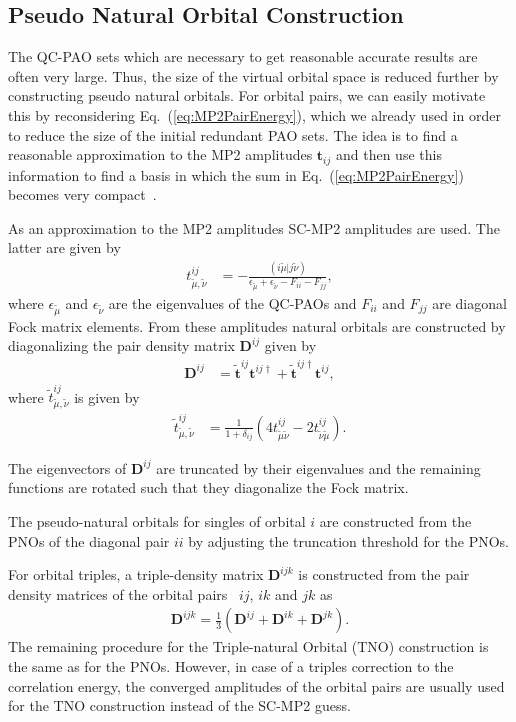 \subsection{Pseudo Natural Orbital Construction}

The QC-PAO sets which are necessary to get reasonable accurate results are often very large. Thus, the size of the
virtual orbital space is reduced further by constructing pseudo natural orbitals. For orbital pairs, we can easily
motivate this by reconsidering Eq.~(\ref{eq:MP2PairEnergy}), which we already used in order to reduce the size of
the initial redundant PAO sets. The idea is to find a reasonable approximation to the MP2 amplitudes $\pmb{t}_{ij}$
and then use this information to find a basis in which the sum in Eq.~(\ref{eq:MP2PairEnergy}) becomes very
compact~\cite{Neese2009b}.

As an approximation to the MP2 amplitudes SC-MP2 amplitudes are used. The latter are given by
\begin{align}
  t^{ij}_{\tilde{\mu},\tilde{\nu}} &= -\frac{(i\tilde{\mu}|j\tilde{\nu})}{{\epsilon_{\tilde{\mu}}}+{\epsilon_{\tilde{\nu}}}-F_{ii}-F_{jj}},
\end{align}
where $\epsilon_{\tilde{\mu}}$ and $\epsilon_{\tilde{\nu}}$ are the eigenvalues of the QC-PAOs and $F_{ii}$ and $F_{jj}$
are diagonal Fock matrix elements.
From these amplitudes natural orbitals are constructed by diagonalizing the pair density matrix $\pmb{D}^{ij}$ given
by
\begin{align}
  \mathbf{D}^{ij} &= \tilde{\mathbf{t}}^{ij}\mathbf{t}^{ij\dagger} + \tilde{\mathbf{t}}^{ij\dagger}\mathbf{t}^{ij},
\end{align}
where $\tilde{t}^{ij}_{\tilde{\mu},\tilde{\nu}}$ is given by
\begin{align}
  \tilde{t}^{ij}_{\tilde{\mu},\tilde{\nu}}  &= \frac{1}{1+\delta_{ij}}(4t^{ij}_{\tilde{\mu}\tilde{\nu}}-2t^{ij}_{\tilde{\nu}\tilde{\mu}}).
\end{align}

The eigenvectors of $\mathbf{D}^{ij}$ are truncated by their eigenvalues and the remaining functions are
rotated such that they diagonalize the Fock matrix.

The pseudo-natural orbitals for singles of orbital $i$ are constructed from the PNOs of the
diagonal pair $ii$ by adjusting the truncation threshold for the PNOs.

For orbital triples, a triple-density matrix $\mathbf{D}^{ijk}$ is constructed from the pair density matrices
of the orbital pairs~\cite{Riplinger2013a} $ij$, $ik$ and $jk$ as
\begin{align}
  \mathbf{D}^{ijk} = \frac{1}{3} \left( \mathbf{D}^{ij} + \mathbf{D}^{ik} +\mathbf{D}^{jk} \right).
\end{align}
The remaining procedure for the Triple-natural Orbital (TNO) construction is the same as for the PNOs.
However, in case of a triples correction to the correlation energy, the converged amplitudes of the orbital
pairs are usually used for the TNO construction instead of the SC-MP2 guess.
